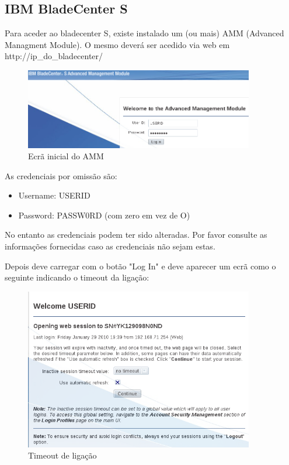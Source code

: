 \subsection{IBM BladeCenter S}

Para aceder ao bladecenter S, existe instalado um (ou mais) AMM (Advanced Managment Module). O mesmo deverá ser acedido via web em http://ip\_do\_bladecenter/

\begin{figure}[H]
    \begin{center}
        \includegraphics[width=10cm]{include/img/amm_bladecenterS_1}
    \end{center}
    \caption{Ecrã inicial do AMM}
    \label{fig:amm-1}
\end{figure}

As credenciais por omissão são:
\begin{itemize}
\item Username: USERID
\item Password: PASSW0RD   (com zero em vez de O)
\end{itemize}

No entanto as credenciais podem ter sido alteradas. Por favor consulte as informações fornecidas caso as credenciais não sejam estas.

Depois deve carregar com o botão "Log In" e deve aparecer um ecrã como o seguinte indicando o timeout da ligação:

\begin{figure}[H]
    \begin{center}
        \includegraphics[width=10cm]{include/img/amm_bladecenterS_2}
    \end{center}
    \caption{Timeout de ligação}
    \label{fig:amm-2}
\end{figure}

